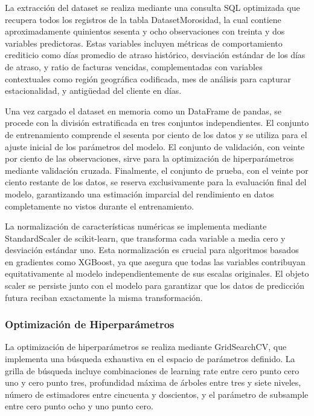 La extracción del dataset se realiza mediante una consulta SQL optimizada que recupera todos los registros de la tabla DatasetMorosidad, la cual contiene aproximadamente quinientos sesenta y ocho observaciones con treinta y dos variables predictoras. Estas variables incluyen métricas de comportamiento crediticio como días promedio de atraso histórico, desviación estándar de los días de atraso, y ratio de facturas vencidas, complementadas con variables contextuales como región geográfica codificada, mes de análisis para capturar estacionalidad, y antigüedad del cliente en días.

Una vez cargado el dataset en memoria como un DataFrame de pandas, se procede con la división estratificada en tres conjuntos independientes. El conjunto de entrenamiento comprende el sesenta por ciento de los datos y se utiliza para el ajuste inicial de los parámetros del modelo. El conjunto de validación, con veinte por ciento de las observaciones, sirve para la optimización de hiperparámetros mediante validación cruzada. Finalmente, el conjunto de prueba, con el veinte por ciento restante de los datos, se reserva exclusivamente para la evaluación final del modelo, garantizando una estimación imparcial del rendimiento en datos completamente no vistos durante el entrenamiento.

La normalización de características numéricas se implementa mediante StandardScaler de scikit-learn, que transforma cada variable a media cero y desviación estándar uno. Esta normalización es crucial para algoritmos basados en gradientes como XGBoost, ya que asegura que todas las variables contribuyan equitativamente al modelo independientemente de sus escalas originales. El objeto scaler se persiste junto con el modelo para garantizar que los datos de predicción futura reciban exactamente la misma transformación.

\subsubsection{Optimización de Hiperparámetros}

La optimización de hiperparámetros se realiza mediante GridSearchCV, que implementa una búsqueda exhaustiva en el espacio de parámetros definido. La grilla de búsqueda incluye combinaciones de learning rate entre cero punto cero uno y cero punto tres, profundidad máxima de árboles entre tres y siete niveles, número de estimadores entre cincuenta y doscientos, y el parámetro de subsample entre cero punto ocho y uno punto cero.

